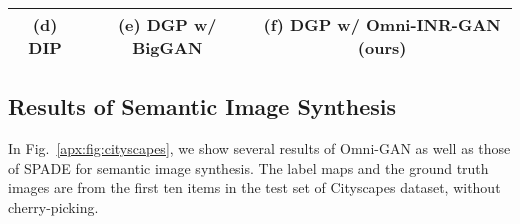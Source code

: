 \documentclass[paper_2425.tex]{subfiles}
\begin{document}
\begin{figure*}[!t]
{\begin{tabular}{cc|ccc}
      \\
      (d) DIP                                                                                                                                     & (e) DGP w/ BigGAN            & \multicolumn{3}{c}{(f) DGP w/ Omni-INR-GAN (ours)}                                                                    \\
      \midrule
    \end{tabular}
  }
  \vspace{-0.3cm}
  \caption{Super-resolution using Omni-INR-GAN's prior, at any scale ($\times1$-$\times60+$). (b) input image with low resolution. (c) LIIF~\cite{chen2020Learning} can extrapolate the input image to any scale, but it cannot add semantic details, so the result is still blurred. (d) DIP~\cite{ulyanov2018Deep} also failed because the input image resolution is too low. (e) DGP~\cite{pan2020Exploiting} with BigGAN must crop the input and upsamples the cropped patch to a fixed size, which is inflexible. (f) Omni-INR-GAN has the ability to upsample the input image to any scale and also adds rich semantic details.}
\label{apx:fig:dgp_SR}
  \vspace{-.5cm}
\end{figure*}


\subsection{Results of Semantic Image Synthesis}

In Fig.~\ref{apx:fig:cityscapes}, we show several results of Omni-GAN as well as those of SPADE for semantic image synthesis. The label maps and the ground truth images are from the first ten items in the test set of Cityscapes dataset, without cherry-picking.
\end{document}

